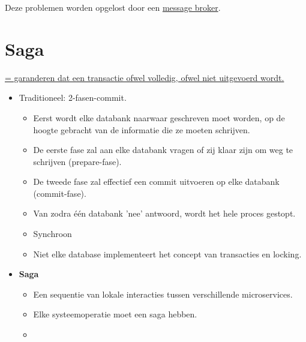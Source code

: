 	Deze problemen worden opgelost door een \underline{message broker}.

	\chapter{Saga}
	\underline{= garanderen dat een transactie ofwel volledig, ofwel niet uitgevoerd wordt.}
	\begin{itemize}
		\item[\info] Traditioneel: 2-fasen-commit.
		\begin{itemize}
			\item[\info] Eerst wordt elke databank naarwaar geschreven moet worden, op de hoogte gebracht van de informatie die ze moeten schrijven.
			\item[\info] De eerste fase zal aan elke databank vragen of zij klaar zijn om weg te schrijven (prepare-fase).
			\item[\info] De tweede fase zal effectief een commit uitvoeren op elke databank (commit-fase).
			\item[\info] Van zodra één databank 'nee' antwoord, wordt het hele proces gestopt.
			\item[\alert] Synchroon
			\item[\alert] Niet elke database implementeert het concept van transacties en locking.
		\end{itemize}
		\item[\info] \textbf{Saga}
		\begin{itemize}
			\item[\info] Een sequentie van lokale interacties tussen verschillende microservices.
			\item[\info] Elke systeemoperatie moet een saga hebben.
			\item[\info] 
		\end{itemize}
	\end{itemize}
	